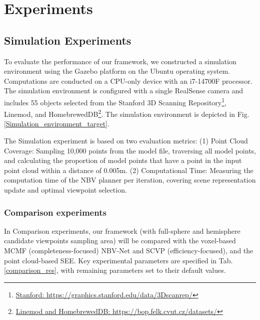 \section{Experiments}
\label{sec:result}

\subsection{Simulation Experiments}
To evaluate the performance of our framework, we constructed a simulation environment using the Gazebo platform on the Ubuntu operating system.
Computations are conducted on a CPU-only device with an i7-14700F processor.
The simulation environment is configured with a single RealSense camera and includes 55 objects selected from the Stanford 3D Scanning Repository\footnote{\href{https://graphics.stanford.edu/data/3Dscanrep/}{Stanford: https://graphics.stanford.edu/data/3Dscanrep/}}, Linemod, and HomebrewedDB\footnote{\href{https://bop.felk.cvut.cz/datasets/}{Linemod and HomebrewedDB: https://bop.felk.cvut.cz/datasets/}}.
The simulation environment is depicted in Fig. \ref{Simulation_environment_target}.


The Simulation experiment is based on two evaluation metrics:
(1) Point Cloud Coverage: Sampling 10,000 points from the model file, traversing all model points, and calculating the proportion of model points that have a point in the input point cloud within a distance of 0.005m.
(2) Computational Time: Measuring the computation time of the NBV planner per iteration, covering scene representation update and optimal viewpoint selection.

\subsubsection{Comparison experiments}
In Comparison experiments, our framework (with full-sphere and hemisphere candidate viewpoints sampling area) will be compared with the voxel-based MCMF\cite{pan2021global} (completeness-focused) NBV-Net\cite{mendoza2020supervised} and SCVP\cite{pan2022scvp} (efficiency-focused), and the point cloud-based SEE\cite{border2024surface}.
Key experimental parameters are specified in Tab. \ref{comparison_res}, with remaining parameters set to their default values.

